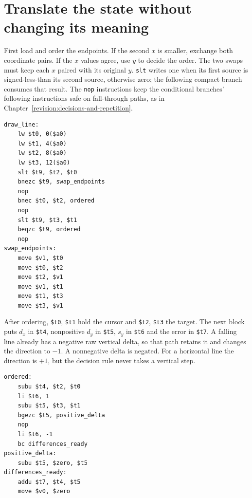 \section{Translate the state without changing its meaning}

First load and order the endpoints. If the second $x$ is smaller, exchange both
coordinate pairs. If the $x$ values agree, use $y$ to decide the order. The two
swaps must keep each $x$ paired with its original $y$. \texttt{slt} writes one when
its first source is signed-less-than its second source, otherwise zero; the
following compact branch consumes that result. The \texttt{nop} instructions keep
the conditional branches' following instructions safe on fall-through paths, as
in Chapter~\ref{revision:decisions-and-repetition}.

\noindent\begin{minipage}{\linewidth}
  \begin{verbatim}
draw_line:
    lw $t0, 0($a0)
    lw $t1, 4($a0)
    lw $t2, 8($a0)
    lw $t3, 12($a0)
    slt $t9, $t2, $t0
    bnezc $t9, swap_endpoints
    nop
    bnec $t0, $t2, ordered
    nop
    slt $t9, $t3, $t1
    beqzc $t9, ordered
    nop
swap_endpoints:
    move $v1, $t0
    move $t0, $t2
    move $t2, $v1
    move $v1, $t1
    move $t1, $t3
    move $t3, $v1
\end{verbatim}
\end{minipage}

After ordering, \texttt{\$t0}, \texttt{\$t1} hold the cursor and \texttt{\$t2},
\texttt{\$t3} the target. The next block puts $d_x$ in \texttt{\$t4}, nonpositive
$d_y$ in \texttt{\$t5}, $s_y$ in \texttt{\$t6} and the error in \texttt{\$t7}.
A falling line already has a negative raw vertical delta, so that path retains it
and changes the direction to $-1$. A nonnegative delta is negated. For a horizontal
line the direction is $+1$, but the decision rule never takes a vertical step.

\noindent\begin{minipage}{\linewidth}
  \begin{verbatim}
ordered:
    subu $t4, $t2, $t0
    li $t6, 1
    subu $t5, $t3, $t1
    bgezc $t5, positive_delta
    nop
    li $t6, -1
    bc differences_ready
positive_delta:
    subu $t5, $zero, $t5
differences_ready:
    addu $t7, $t4, $t5
    move $v0, $zero
\end{verbatim}
\end{minipage}

